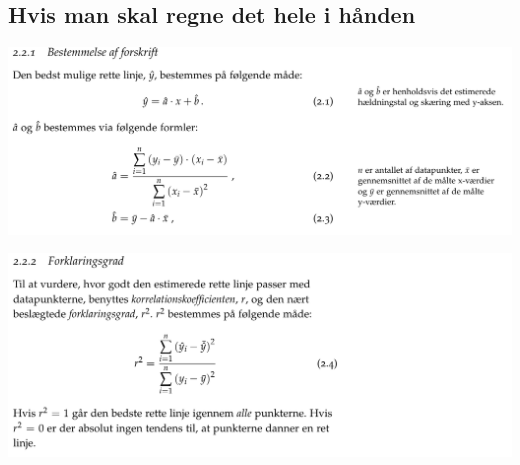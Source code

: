 \documentclass[11pt]{article}
\begin{document}
\subsection*{Hvis man skal regne det hele i hånden}
\label{sec:org926368c}

\begin{center}
\includegraphics[width=.9\linewidth]{img/screenshot_2019-09-05_11-35-40.png}
\end{center}

\begin{center}
\includegraphics[width=.9\linewidth]{img/screenshot_2019-09-05_11-37-21.png}
\end{center}
\end{document}
